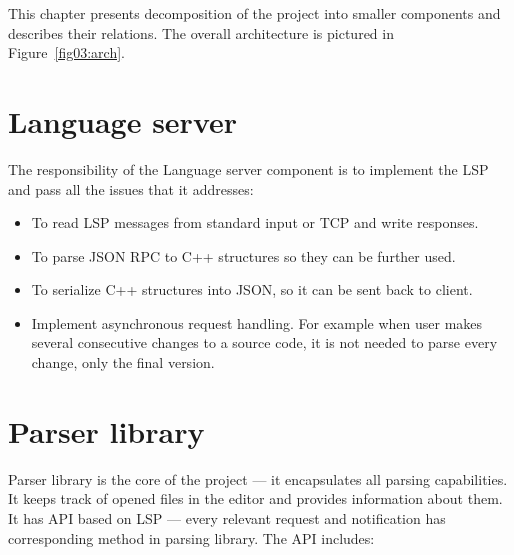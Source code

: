 This chapter presents decomposition of the project into smaller components and describes their relations. The overall architecture is pictured in Figure~\ref{fig03:arch}.

\section{Language server}

The responsibility of the Language server component is to implement the LSP and pass all the issues that it addresses:

\begin{itemize}
    \item To read LSP messages from standard input or TCP and write responses.
    \item To parse JSON RPC to C++ structures so they can be further used.
    \item To serialize C++ structures into JSON, so it can be sent back to client.
    \item Implement asynchronous request handling. For example when user makes several consecutive changes to a source code, it is not needed to parse every change, only the final version.
\end{itemize}

\section{Parser library}

Parser library is the core of the project --- it encapsulates all parsing capabilities. It keeps track of opened files in the editor and provides information about them. It has API based on LSP --- every relevant request and notification has corresponding method in parsing library. The API includes:

